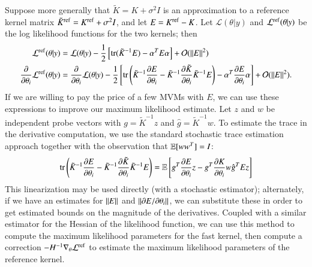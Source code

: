 Suppose more generally that $\tilde K = K + \sigma^2 I$ is an approximation to a
reference kernel matrix $\tilde K^{\operatorname{ref}} = K^{\operatorname{ref}} + \sigma^2 I$, and let $E =
K^{\operatorname{ref}}-K$.  Let $\mathcal{L}(\theta | y)$ and $\mathcal{L}^{\operatorname{ref}}(\theta | y)$ be
the log likelihood functions for the two kernels; then
\begin{align}
  \mathcal{L}^{\operatorname{ref}}(\theta | y) &=
  \mathcal{L}(\theta | y) -\frac{1}{2} \left[\operatorname{tr}(\tilde K^{-1} E) - \alpha^T E \alpha
  \right] + \mathcal{O}(\|E\|^2) \\
  \frac{\partial}{\partial \theta_i} \mathcal{L}^{\operatorname{ref}}(\theta | y) &=
  \frac{\partial}{\partial \theta_i} \mathcal{L}(\theta | y) - \frac{1}{2}
  \left[\operatorname{tr}\left( \tilde K^{-1} \frac{\partial E}{\partial \theta_i} - \tilde K^
  {-1} \frac{\partial \tilde K}{\partial \theta_i} \tilde K^{-1} E \right) -
  \alpha^T \frac{\partial E}{\partial \theta_i}  \alpha \right] + \mathcal{O}
  (\left\lVert E\right\rVert^2).
\end{align}
If we are willing to pay the price of a few MVMs with $E$, we can use these
expressions to improve our maximum likelihood estimate. Let $z$ and $w$ be
independent probe vectors with $g = \tilde K^{-1} z$ and $\hat{g} = \tilde K^
{-1} w$. To estimate the trace in the derivative computation, we use the
standard stochastic trace estimation approach together with the observation that
$\operatorname{\mathbb{E}}[ww^T] = I$:
\begin{equation}
 \operatorname{tr}\left(\tilde K^{-1} \frac{\partial E}{\partial \theta_i} - \tilde K^{-1} 
 \frac{\partial \tilde K}{\partial \theta_i} \tilde K^{-1} E \right) =
 \operatorname{\mathbb{E}}\left[ g^T \frac{\partial E}{\partial \theta_i} z - g^T \frac{\partial K}
 {\partial \theta_i} w \hat{g}^T E z\right]
\end{equation}
This linearization may be used directly (with a stochastic estimator);
alternately, if we have an estimates for $\left\lVert E\right\rVert$ and $\left\lVert\partial
E/\partial \theta_i\right\rVert$, we can substitute these in order to get estimated bounds
on the magnitude of the derivatives. Coupled with a similar estimator for the
Hessian of the likelihood function, we can use this method to compute the
maximum likelihood parameters for the fast kernel, then compute a correction
$-H^{-1} \nabla_{\theta} \mathcal{L}^{\operatorname{ref}}$ to estimate the maximum likelihood
parameters of the reference kernel.